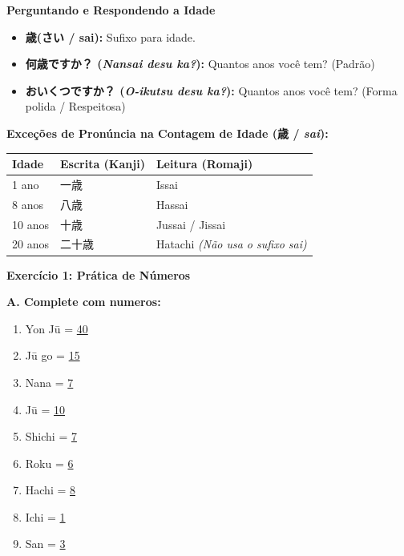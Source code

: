 \documentclass[12pt,a4paper]{article}
\begin{document}
\vspace{0.3cm}

\textbf{Perguntando e Respondendo a Idade}
\begin{itemize}[leftmargin=*]
    \item \textbf{歳(さい / sai):} Sufixo para idade.
    \item \textbf{何歳ですか？ (\textit{Nansai desu ka?}):} Quantos anos você tem? (Padrão)
    \item \textbf{おいくつですか？ (\textit{O-ikutsu desu ka?}):} Quantos anos você tem? (Forma polida / Respeitosa)
\end{itemize}

\vspace{0.2cm}

\textbf{Exceções de Pronúncia na Contagem de Idade (歳 / \textit{sai}):}

\noindent
\begin{tabularx}{\textwidth}{l X X}
\toprule
\textbf{Idade} & \textbf{Escrita (Kanji)} & \textbf{Leitura (Romaji)} \\
\midrule
1 ano & 一歳 & Issai \\
8 anos & 八歳 & Hassai \\
10 anos & 十歳 & Jussai / Jissai \\
20 anos & 二十歳  & Hatachi \textit{(Não usa o sufixo sai)} \\
\bottomrule
\end{tabularx}




\vspace{0.4cm}

\textbf{Exercício 1: Prática de Números}

\small
\textbf{A. Complete com numeros:}
\begin{enumerate}[label=\arabic*.]
    \item Yon Jū = \underline{40}
    \item Jū go = \underline{15} 
    \item Nana = \underline{7}
    \item Jū = \underline{10} 
    \item Shichi = \underline{7} 
    \item Roku = \underline{6} 
    \item Hachi = \underline{8} 
    \item Ichi = \underline{1} 
    \item San = \underline{3} 
\end{enumerate}
\end{document}
